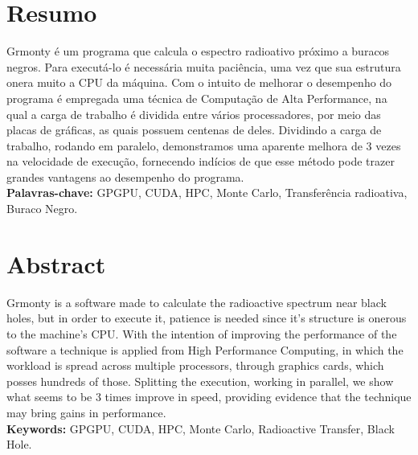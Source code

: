 \documentclass[12pt,twoside,a4paper]{book}
\begin{document}


\chapter*{Resumo}
  Grmonty é um programa que calcula o espectro radioativo próximo a buracos negros. Para executá-lo é necessária muita paciência, uma vez que sua estrutura onera muito a CPU da máquina. Com o intuito de melhorar o desempenho do programa é empregada uma técnica de Computação de Alta Performance, na qual a carga de trabalho é dividida entre vários processadores, por meio das placas de gráficas, as quais possuem centenas de deles. Dividindo a carga de trabalho, rodando em paralelo, demonstramos uma aparente melhora de 3 vezes na velocidade de execução, fornecendo indícios de que esse método pode trazer grandes vantagens ao desempenho do programa.
\\

\noindent \textbf{Palavras-chave:} GPGPU, CUDA, HPC, Monte Carlo, Transferência radioativa, Buraco Negro.

\chapter*{Abstract}
  Grmonty is a software made to calculate the radioactive spectrum near black holes, but in order to execute it, patience is needed since it's structure is onerous to the machine's CPU. With the intention of improving the performance of the software a technique is applied from High Performance Computing, in which the workload is spread across multiple processors, through graphics cards, which posses hundreds of those. Splitting the execution, working in parallel, we show what seems to be 3 times improve in speed, providing evidence that the technique may bring gains in performance.
\\

\noindent \textbf{Keywords:} GPGPU, CUDA, HPC, Monte Carlo, Radioactive Transfer, Black Hole.


\tableofcontents

\end{document}
